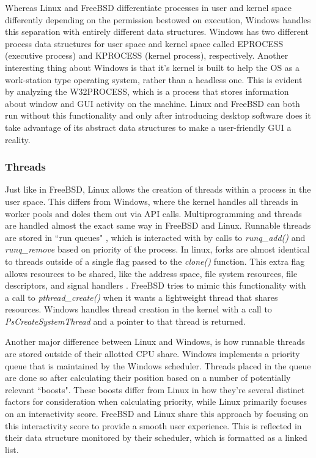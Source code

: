 \documentclass[10pt,draftclsnofoot,onecolumn]{IEEEtran}
\begin{document}
\par Whereas Linux and FreeBSD differentiate processes in user and kernel space differently depending on the permission bestowed on execution, Windows handles this separation with entirely different data structures.
Windows has two different process data structures for user space and kernel space called EPROCESS (executive process) and KPROCESS (kernel process), respectively.
Another interesting thing about Windows is that it's kernel is built to help the OS as a work-station type operating system, rather than a headless one.
This is evident by analyzing the W32PROCESS, which is a process that stores information about window and GUI activity on the machine.
Linux and FreeBSD can both run without this functionality and only after introducing desktop software does it take advantage of its abstract data structures to make a user-friendly GUI a reality.

\subsubsection{Threads}
\label{sub:Threads Linux}
\par Just like in FreeBSD, Linux allows the creation of threads within a process in the user space.
This differs from Windows, where the kernel handles all threads in worker pools and doles them out via API calls.
Multiprogramming and threads are handled almost the exact same way in FreeBSD and Linux.
Runnable threads are stored in ``run queues" \cite{bsd:1} \cite{linux:1}, which is interacted with by calls to \textit{runq\_add()} and \textit{runq\_remove} based on priority of the process.
In linux, forks are almost identical to threads outside of a single flag passed to the \textit{clone()} function.
This extra flag allows resources to be shared, like the address space, file system resources, file descriptors, and signal handlers \cite{linux:1}.
FreeBSD tries to mimic this functionality with a call to \textit{pthread\_create()} when it wants a lightweight thread that shares resources.
Windows handles thread creation in the kernel with a call to \textit{PsCreateSystemThread} and a pointer to that thread is returned.

\par Another major difference between Linux and Windows, is how runnable threads are stored outside of their allotted CPU share.
Windows implements a priority queue that is maintained by the Windows scheduler.
Threads placed in the queue are done so after calculating their position based on a number of potentially relevant ``boosts".
These boosts differ from Linux in how they're several distinct factors for consideration when calculating priority, while Linux primarily focuses on an interactivity score.
FreeBSD and Linux share this approach by focusing on this interactivity score to provide a smooth user experience.
This is reflected in their data structure monitored by their scheduler, which is formatted as a linked list.
\end{document}
